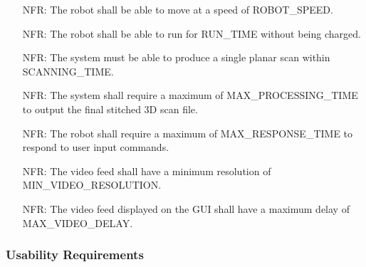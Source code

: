 \documentclass[12pt]{article}
\newcounter{nfrnum} %
\begin{document}
\noindent \begin{itemize}
\item[NFR\refstepcounter{nfrnum}\thenfrnum\label{NFR_Performance1}:] The robot shall be able to move at a speed of ROBOT\_SPEED.
\item[NFR\refstepcounter{nfrnum}\thenfrnum\label{NFR_Performance2}:] The robot shall be able to run for RUN\_TIME without being charged.
\item[NFR\refstepcounter{nfrnum}\thenfrnum\label{NFR_Performance3}:] The system must be able to produce a single planar scan within SCANNING\_TIME.
\item[NFR\refstepcounter{nfrnum}\thenfrnum\label{NFR_Performance4}:] The system shall require a maximum of MAX\_PROCESSING\_TIME to output the final stitched 3D scan file.
\item[NFR\refstepcounter{nfrnum}\thenfrnum\label{NFR_Performance5}:] The robot shall require a maximum of MAX\_RESPONSE\_TIME to respond to user input commands.
\item[NFR\refstepcounter{nfrnum}\thenfrnum\label{NFR_Performance6}:] The video feed shall have a minimum resolution of MIN\_VIDEO\_RESOLUTION.
\item[NFR\refstepcounter{nfrnum}\thenfrnum\label{NFR_Performance7}:] The video feed displayed on the GUI shall have a maximum delay of MAX\_VIDEO\_DELAY.
\end{itemize}

\subsubsection{Usability Requirements}
\end{document}
